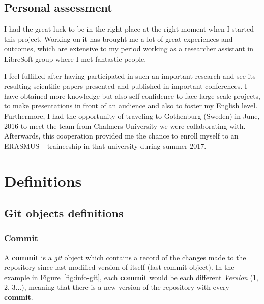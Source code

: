 \documentclass[a4paper, 12pt]{book}
\begin{document}
\section{Personal assessment}
\label{sec:assessment}
I had the great luck to be in the right place at the right moment when I started this project.
Working on it has brought me a lot of great experiences and outcomes, which are
extensive to my period working as a researcher assistant in LibreSoft group where I met fantastic people.\par
I feel fulfilled after having participated in such an important research and see its resulting scientific papers
presented and published in important conferences. I have obtained more knowledge but also self-confidence to face large-scale
projects, to make presentations in front of an audience and also to foster my English level. Furthermore,
I had the opportunity of traveling to Gothenburg (Sweden) in June, 2016 to meet the team from Chalmers University
we were collaborating with. Afterwards, this cooperation provided me the chance to enroll myself to an
ERASMUS+ traineeship in that university during summer 2017.\par
\cleardoublepage
\appendix
\chapter{Definitions}
\label{app:definitions}
\section{Git objects definitions}
\label{sec:git-definitions}
\subsection{Commit}
\label{ssec:git-commit}
A \textbf{commit} is a \emph{git} object which contains a record of the changes made to the repository since last modified
version of itself (last commit object). In the example in Figure~\ref{fig:info-git}, each \textbf{commit} would be each different
\textit{Version} (1, 2, 3...), meaning that there is a new version of the repository with every \textbf{commit}.
\end{document}
